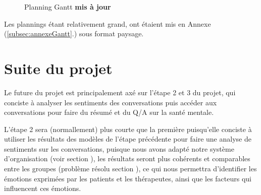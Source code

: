 \documentclass[12pt,a4paper]{article}
\begin{document}
\begin{figure}[H]
\caption{\centering\small Planning Gantt \textbf{mis à jour}}
\end{figure}

Les plannings étant relativement grand, ont étaient mis en Annexe (\ref{subsec:annexeGantt}.) sous format paysage.

\pagebreak
\section{Suite du projet}

Le future du projet est principalement axé sur l'étape 2 et 3 du projet, qui conciste à analyser les sentiments 
des conversations puis accéder aux conversations pour faire du résumé et du Q/A sur la santé mentale.

L'étape 2 sera (normallement) plus courte que la première puisqu'elle conciste à utiliser les résultats des modèles de l'étape précédente pour
faire une analyse de sentiments sur les conversations, puisque nous avons adapté notre système d'organisation 
(voir section ), les résultats seront plus cohérents et comparables 
entre les groupes (problème résolu section ),
ce qui nous permettra d'identifier les émotions exprimées par les patients et les thérapeutes,
ainsi que les facteurs qui influencent ces émotions.
\end{document}
